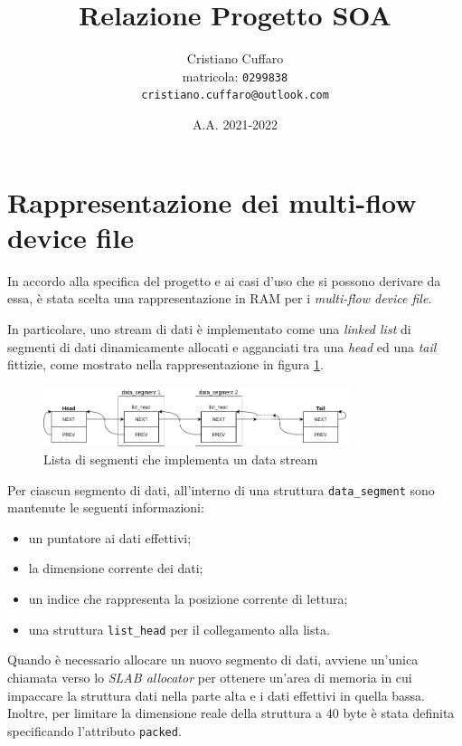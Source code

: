 \documentclass{article}
\begin{document}
\author{%
Cristiano Cuffaro \\
{\small matricola: \texttt{0299838}} \\
{\small \texttt{cristiano.cuffaro@outlook.com}}
}
\title{Relazione Progetto SOA}
\date{A.A. 2021-2022}

\maketitle
\tableofcontents
\newpage

\section{Rappresentazione dei multi-flow device file}
In accordo alla specifica del progetto e ai casi d'uso che si possono derivare da essa, è stata scelta una rappresentazione in RAM per i \textsl{multi-flow device file}.

In particolare, uno stream di dati è implementato come una \textsl{linked list} di segmenti di dati dinamicamente allocati e agganciati tra una \textsl{head} ed una \textsl{tail} fittizie, come mostrato nella rappresentazione in figura \ref{fig-1}.

\captionsetup[figure]{justification=centering}
\begin{figure}[ht]
\centering
\includegraphics[width=0.8\textwidth]{img/segment-list}
\caption{Lista di segmenti che implementa un data stream}
\label{fig-1}
\end{figure}

Per ciascun segmento di dati, all'interno di una struttura \texttt{data\_segment} sono mantenute le seguenti informazioni:
\begin{itemize}
\item un puntatore ai dati effettivi;
\item la dimensione corrente dei dati;
\item un indice che rappresenta la posizione corrente di lettura;
\item una struttura \texttt{list\_head} per il collegamento alla lista.
\end{itemize}
Quando è necessario allocare un nuovo segmento di dati, avviene un'unica chiamata verso lo \textsl{SLAB allocator} per ottenere un'area di memoria in cui impaccare la struttura dati nella parte alta e i dati effettivi in quella bassa. Inoltre, per limitare la dimensione reale della struttura a 40 byte è stata definita specificando l'attributo \texttt{packed}.
\end{document}
